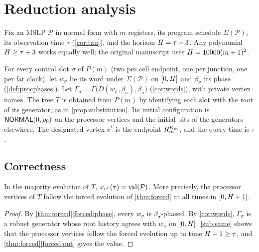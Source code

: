 \section{Reduction analysis}\label{sec:analysis}

Fix an MSLP $\mathcal P$ in normal form with $m$ registers, its program schedule
$\Sigma(\mathcal P)$, its observation time $\tau$ (\cref{cor:tau}), and the horizon $H=\tau+3$.
Any polynomial $H\ge\tau+3$ works equally well; the original manuscript uses
$H=10000(m+1)^2$.

\begin{construction}\label{con:tree}
For every control slot $\sigma$ of $P(m)$ (two per cell endpoint, one per junction, one per far
clock), let $w_\sigma$ be its word under $\Sigma(\mathcal P)$ on $[0,H]$ and $\beta_\sigma$ its
phase (\cref{def:procphases}). Let $\Gamma_\sigma=\Gamma\bigl(D(w_\sigma,\beta_\sigma),\beta_\sigma\bigr)$
(\cref{cor:words}), with private vertex names. The tree $T$ is obtained from $P(m)$ by identifying
each slot with the root of its generator, as in \cref{prop:substitution}. Its initial configuration
is $\textsf{NORMAL}(0,\rho_0)$ on the processor vertices and the initial bits of the generators elsewhere. The
designated vertex $v^\ast$ is the endpoint $R_m^{K_m}$, and the query time is $\tau$.
\end{construction}

\subsection{Correctness}

\begin{proposition}[Correctness]\label{prop:correct}
In the majority evolution of $T$, $x_{v^\ast}(\tau)=\operatorname{val}(\mathcal P)$. More precisely, the
processor vertices of $T$ follow the forced evolution of \cref{thm:forced} at all times in
$[0,H+1]$.
\end{proposition}

\begin{proof}
By \cref{thm:forced}\ref{forced:phase}, every $w_\sigma$ is $\beta_\sigma$-phased. By
\cref{cor:words}, $\Gamma_\sigma$ is a robust generator whose root history agrees with $w_\sigma$ on
$[0,H]$. \ref{sub:same} shows that the processor vertices follow the forced
evolution up to time $H+1\ge\tau$, and \cref{thm:forced}\ref{forced:out} gives the value.
\end{proof}

